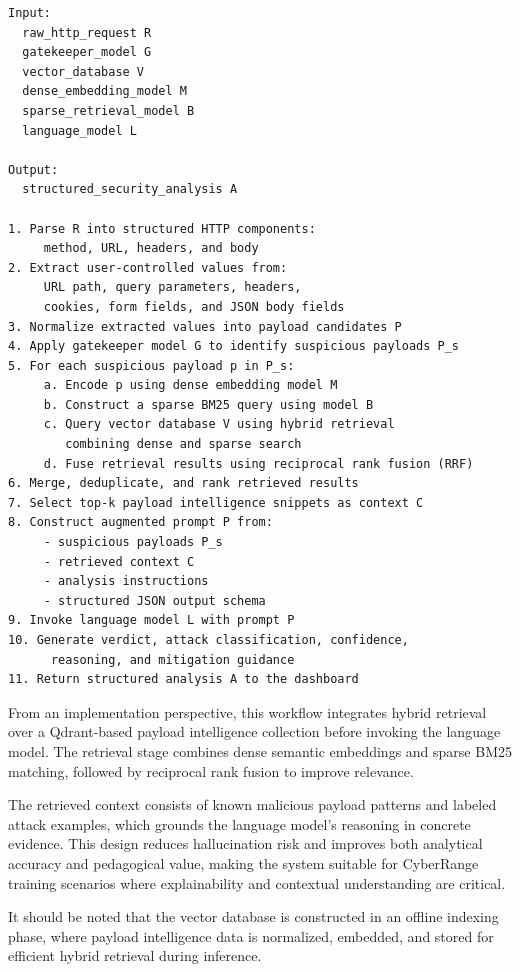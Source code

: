\begin{lstlisting}[caption={Hybrid RAG-based payload analysis workflow},label={alg:rag-analysis},basicstyle=\ttfamily\small,breaklines=true]
Input:
  raw_http_request R
  gatekeeper_model G
  vector_database V
  dense_embedding_model M
  sparse_retrieval_model B
  language_model L

Output:
  structured_security_analysis A

1. Parse R into structured HTTP components:
     method, URL, headers, and body
2. Extract user-controlled values from:
     URL path, query parameters, headers,
     cookies, form fields, and JSON body fields
3. Normalize extracted values into payload candidates P
4. Apply gatekeeper model G to identify suspicious payloads P_s
5. For each suspicious payload p in P_s:
     a. Encode p using dense embedding model M
     b. Construct a sparse BM25 query using model B
     c. Query vector database V using hybrid retrieval
        combining dense and sparse search
     d. Fuse retrieval results using reciprocal rank fusion (RRF)
6. Merge, deduplicate, and rank retrieved results
7. Select top-k payload intelligence snippets as context C
8. Construct augmented prompt P from:
     - suspicious payloads P_s
     - retrieved context C
     - analysis instructions
     - structured JSON output schema
9. Invoke language model L with prompt P
10. Generate verdict, attack classification, confidence,
      reasoning, and mitigation guidance
11. Return structured analysis A to the dashboard
\end{lstlisting}

From an implementation perspective, this workflow integrates hybrid retrieval over a Qdrant-based payload intelligence collection before invoking the language model. The retrieval stage combines dense semantic embeddings and sparse BM25 matching, followed by reciprocal rank fusion to improve relevance.

The retrieved context consists of known malicious payload patterns and labeled attack examples, which grounds the language model's reasoning in concrete evidence. This design reduces hallucination risk and improves both analytical accuracy and pedagogical value, making the system suitable for CyberRange training scenarios where explainability and contextual understanding are critical.

It should be noted that the vector database is constructed in an offline indexing phase, where payload intelligence data is normalized, embedded, and stored for efficient hybrid retrieval during inference.


